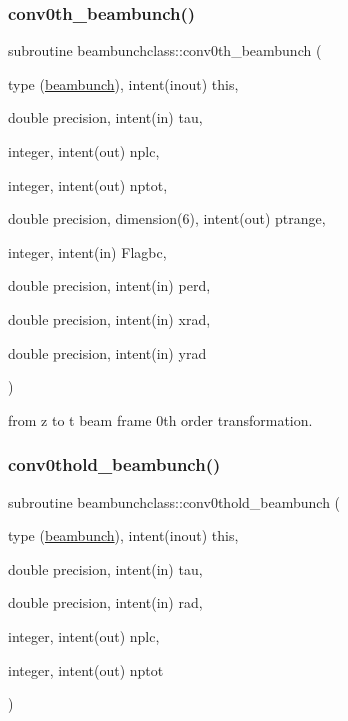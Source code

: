 \subsubsection{\texorpdfstring{conv0th\_beambunch()}{conv0th\_beambunch()}}
{\footnotesize\ttfamily subroutine beambunchclass\+::conv0th\+\_\+beambunch (\begin{DoxyParamCaption}\item[{type (\mbox{\hyperlink{namespacebeambunchclass_structbeambunchclass_1_1beambunch}{beambunch}}), intent(inout)}]{this,  }\item[{double precision, intent(in)}]{tau,  }\item[{integer, intent(out)}]{nplc,  }\item[{integer, intent(out)}]{nptot,  }\item[{double precision, dimension(6), intent(out)}]{ptrange,  }\item[{integer, intent(in)}]{Flagbc,  }\item[{double precision, intent(in)}]{perd,  }\item[{double precision, intent(in)}]{xrad,  }\item[{double precision, intent(in)}]{yrad }\end{DoxyParamCaption})}



from z to t beam frame 0th order transformation. 

\mbox{\label{namespacebeambunchclass_a374fdc0e530a8835113fcd674283a150}} 
\subsubsection{\texorpdfstring{conv0thold\_beambunch()}{conv0thold\_beambunch()}}
{\footnotesize\ttfamily subroutine beambunchclass\+::conv0thold\+\_\+beambunch (\begin{DoxyParamCaption}\item[{type (\mbox{\hyperlink{namespacebeambunchclass_structbeambunchclass_1_1beambunch}{beambunch}}), intent(inout)}]{this,  }\item[{double precision, intent(in)}]{tau,  }\item[{double precision, intent(in)}]{rad,  }\item[{integer, intent(out)}]{nplc,  }\item[{integer, intent(out)}]{nptot }\end{DoxyParamCaption})}




